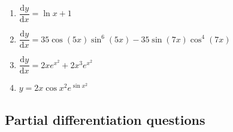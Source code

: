 \documentclass[
]{book}
\providecommand{\tightlist}{%
  \setlength{\itemsep}{0pt}\setlength{\parskip}{0pt}}
\begin{document}
\begin{enumerate}
\def\labelenumi{\arabic{enumi}.}
\tightlist
\item
  \(\dfrac{\textrm{d}y}{\textrm{d}x}=\ln x +1\)
\item
  \(\dfrac{\textrm{d}y}{\textrm{d}x}=35 \cos (5x) \sin^6 (5x) - 35 \sin (7x) \cos^4(7x)\)
\item
  \(\dfrac{\textrm{d}y}{\textrm{d}x}=2x e^{x^2}+ 2x^3e^{x^2}\)
\item
  \(y=2x \cos x^2 e^{\sin x^2}\)
\end{enumerate}

\hypertarget{partial-differentiation-questions-1}{%
\subsection{Partial differentiation questions}\label{partial-differentiation-questions-1}}
\end{document}
